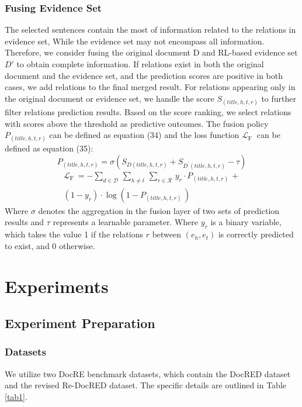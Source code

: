\documentclass[preprint,12pt]{elsarticle}
\begin{document}
\subsubsection{Fusing Evidence Set}\label{subsubsec7}
The selected sentences contain the most of information related to the relations in evidence set, While the evidence set may not encompass all information. Therefore, we consider fusing  the original document D and RL-based evidence set $D'$ to obtain complete information. If relations exist  in both the original document and the evidence set, and the prediction scores are positive in both cases,  we add relations to the final merged result. For relations appearing only in the original document or evidence set, we handle the score $S_{(title,h,t,r)}$ to further filter relations prediction results. Based on the score ranking, we select relations with scores above the threshold as predictive outcomes. The fusion policy $P_{(title,h,t,r)}$ can be defined as equation (34) and the loss function $\mathcal{L}_{\text{F~}}$  can be defined as equation (35):
\begin{equation}
P_{({title,h,t,r})} = \sigma\left( {S_{D{({title,h,t,r})}} + S_{D^{'}{({title,h,t,r})}} - \tau} \right)
\label{eq34}
\end{equation}
\begin{equation}
\begin{matrix}
{\mathcal{L}_{\text{F~}} = - \sum_{d \in \mathcal{D}}\,\sum_{h \neq t}\,\sum_{r \in \mathcal{R}}\,y_{r} \cdot P_{(title,h,t,r)\ } +} \\
{\left( {1 - y_{r}} \right) \cdot {\log\left( {1 - P_{{({title,h,t,r})}\ }} \right)}}
\end{matrix}
\label{eq35}
\end{equation}
Where $\sigma$ denotes the aggregation in the fusion layer of two sets of prediction results and $\tau$ represents a learnable parameter. Where  $y_r$ is a binary variable, which takes the value 1 if the relations $r$ between $(e_h,e_t)$ is correctly predicted to exist, and 0 otherwise.


\section{Experiments}\label{sec5}
\subsection{Experiment Preparation}\label{subsec3}
\subsubsection{Datasets}\label{subsubsec7}
We utilize two DocRE benchmark datasets, which contain the DocRED dataset and the revised Re-DocRED dataset\cite{tan-etal-2022-revisiting}. The specific details are outlined in Table \ref{tab1}.
\end{document}
